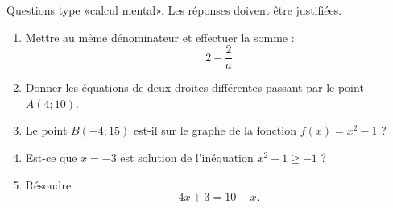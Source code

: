 
\begin{exercice}\label{exosmath-0693}

    Questions type «calcul mental». Les réponses doivent être justifiées.
    \begin{multicols}{2}
        \begin{enumerate}
            \item
                Mettre au même dénominateur et effectuer la somme :
                \begin{equation}
                    2-\frac{ 2 }{ a }
                \end{equation}
            \item
                Donner les équations de deux droites différentes passant par le point \( A(4;10)\).
            \item
                Le point \( B(-4;15)\) est-il sur le graphe de la fonction \( f(x)=x^2-1\) ?
            \item
                Est-ce que \( x=-3\) est solution de l'inéquation \( x^2+1\geq -1\) ?
            \item
                Résoudre 
                \begin{equation}
                    4x+3=10-x.
                \end{equation}
        \end{enumerate}
    \end{multicols}

\end{exercice}

